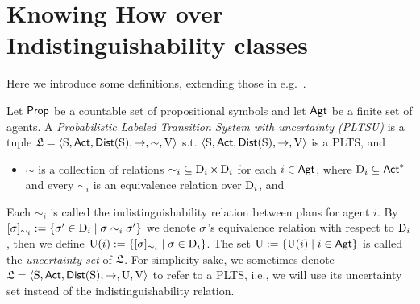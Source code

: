 \section{Knowing How over Indistinguishability classes}
\label{sec:kh:indistinguishability}

Here we introduce some definitions, extending those in e.g.~\cite{AFSVQ21,AFSVQ23}.


\begin{definition}\label{def:plts}
    Let ${\rm \sf Prop}$ be a countable set of propositional symbols and let ${\rm \sf Agt}$ be a finite set of agents.  
    A \emph{Probabilistic Labeled Transition System with uncertainty (PLTSU)}  is a tuple
    $\mathfrak{L}=\langle{\operatorname{S},{\rm \sf Act},\mathsf{Dist}(\operatorname{S}),\rightarrow,\sim,\operatorname{V}}\rangle$ s.t. $\langle{\operatorname{S},{\rm \sf Act},\mathsf{Dist}(\operatorname{S}),\rightarrow,\operatorname{V}}\rangle$ is a PLTS, and 
    \begin{itemize}
        \item ${\sim}$ is a collection of relations ${\sim_i}\subseteq \operatorname{D}_{i}\times \operatorname{D}_{i}$ for each $i\in{\rm \sf Agt}$, where $\operatorname{D}_{i}\subseteq{\rm \sf Act}^*$ and every $\sim_i$ is an equivalence relation over $\operatorname{D}_{i}$, and 
    \end{itemize}
    Each $\sim_i$ is called the indistinguishability relation between plans for agent $i$. 
    By $[\sigma]_{\sim_i}:=\{{\sigma' \in \operatorname{D}_{i} \mid \sigma \sim_i \sigma'}\}$ we denote $\sigma$'s equivalence relation with respect to $\operatorname{D}_{i}$, then we define $\operatorname{U}(i) := \{{[\sigma]_{\sim_i} \mid \sigma\in\operatorname{D}_{i}}\}$. The set $\operatorname{U}:=\{{\operatorname{U}(i) \mid i\in{\rm \sf Agt}}\}$ is called the \emph{uncertainty set} of $\mathfrak{L}$. For simplicity sake, we sometimes denote $\mathfrak{L}=\langle{\operatorname{S},{\rm \sf Act},\mathsf{Dist}(\operatorname{S}),\rightarrow,\operatorname{U},\operatorname{V}}\rangle$ to refer to a PLTS, i.e., we will use its uncertainty set instead of the indistinguishability relation.
\end{definition}

